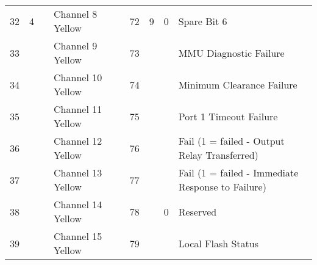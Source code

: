 \documentclass[]{article}
\begin{document}
\begin{landscape}
\begin{table}[]
\begin{tabular}{lllllllll}
			32                       & \multirow{-8}{*}{4}      & \multirow{-8}{*}{}       & Channel 8 Yellow               &                    & 72                                                    & \multirow{-8}{*}{9}  & 0                  & Spare Bit 6                                       \\ \cline{1-4} \cline{6-9} 
			33                       &                          &                          & Channel 9 Yellow               &                    & 73                                                    &                      &                    & MMU Diagnostic Failure                            \\
			34                       &                          &                          & Channel 10 Yellow              &                    & 74                                                    &                      &                    & Minimum Clearance Failure                         \\
			35                       &                          &                          & Channel 11 Yellow              &                    & 75                                                    &                      &                    & Port 1 Timeout Failure                            \\
			36                       &                          &                          & Channel 12 Yellow              &                    & 76                                                    &                      &                    & Fail (1 = failed - Output Relay Transferred)      \\
			37                       &                          &                          & Channel 13 Yellow              &                    & 77                                                    &                      &                    & Fail (1 = failed - Immediate Response to Failure) \\ \cline{8-9} 
			38                       &                          &                          & Channel 14 Yellow              &                    & 78                                                    &                      & 0                  & Reserved                                          \\ \cline{8-9} 
			39                       &                          &                          & Channel 15 Yellow              &                    & 79                                                    &                      &                    & Local Flash Status                                \\

\end{tabular}
\end{table}
\end{landscape}
\end{document}
